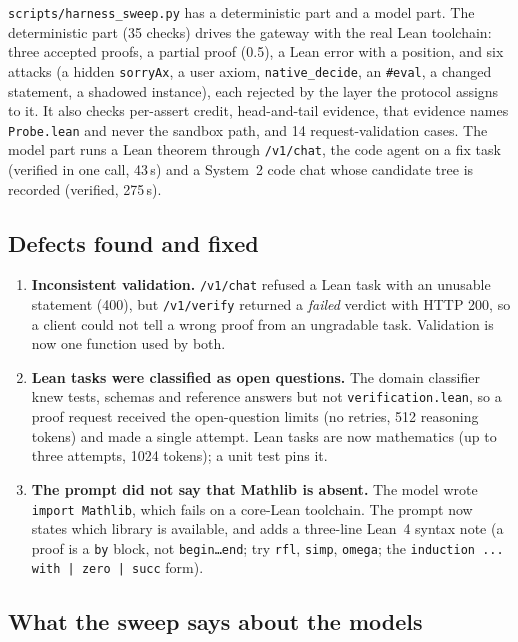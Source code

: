 \texttt{scripts/harness\_sweep.py} has a deterministic part and a model part. The
deterministic part (35 checks) drives the gateway with the real Lean toolchain:
three accepted proofs, a partial proof (0.5), a Lean error with a position, and
six attacks (a hidden \texttt{sorryAx}, a user axiom, \texttt{native\_decide}, an
\texttt{\#eval}, a changed statement, a shadowed instance), each rejected by the layer the
protocol assigns to it. It also checks per-assert credit, head-and-tail evidence,
that evidence names \texttt{Probe.lean} and never the sandbox path, and 14
request-validation cases. The model part runs a Lean theorem through
\texttt{/v1/chat}, the code agent on a fix task (verified in one call, 43\,s) and a
System~2 code chat whose candidate tree is recorded (verified, 275\,s).

\subsection{Defects found and fixed}

\begin{enumerate}
\item \textbf{Inconsistent validation.} \texttt{/v1/chat} refused a Lean task with
an unusable statement (400), but \texttt{/v1/verify} returned a \emph{failed}
verdict with HTTP 200, so a client could not tell a wrong proof from an
ungradable task. Validation is now one function used by both.
\item \textbf{Lean tasks were classified as open questions.} The domain
classifier knew tests, schemas and reference answers but not
\texttt{verification.lean}, so a proof request received the open-question limits
(no retries, 512 reasoning tokens) and made a single attempt. Lean tasks are now
mathematics (up to three attempts, 1024 tokens); a unit test pins it.
\item \textbf{The prompt did not say that Mathlib is absent.} The model wrote
\texttt{import Mathlib}, which fails on a core-Lean toolchain. The prompt now states
which library is available, and adds a three-line Lean~4 syntax note (a proof is a
\texttt{by} block, not \texttt{begin\ldots end}; try \texttt{rfl}, \texttt{simp},
\texttt{omega}; the \texttt{induction ... with | zero | succ} form).
\end{enumerate}

\subsection{What the sweep says about the models}

